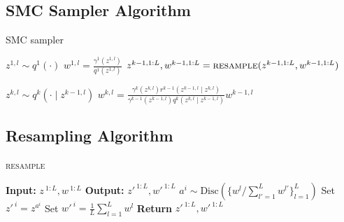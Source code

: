 \documentclass[anonymous=false, %
               format=acmsmall, %
               review=true, %
               screen=true, %
               nonacm=true]{acmart}
\theoremstyle{definition}
\begin{document}
\subsection{SMC Sampler Algorithm}
\label{appendix:smc-alg}
\begin{algorithm}[!h]
  \caption{SMC sampler}
  \label{alg:smcs}
\begin{algorithmic}[1]
    \small
        \State $z^{1,l} \sim q^1(\cdot)$
        \State $w^{1,l} = \frac{\gamma^1(z^{1,l})}{q^1(z^{1,l})}$
    \EndFor
      \State$z^{k-1,1:L}, w^{k-1,1:L}=\textsc{resample}(z^{k-1,1:L}, w^{k-1,1:L})$

          \State $z^{k,l} \sim q^k(\cdot \mid z^{k-1,l})$\label{line:apg-propose}
          \State $w^{k,l} = \frac{\gamma^k(z^{k,l}) r^{k-1}(z^{k-1,l} \mid z^{k,l})}{\gamma^{k-1}(z^{k-1,l}) q^k(z^{k,l} \mid z^{k-1,l})}w^{k-1,l}$
      \EndFor
    \EndFor
\end{algorithmic}
\end{algorithm}

\subsection{Resampling Algorithm}
\label{appendix:resample-alg}
\begin{algorithm}[!h]
  \caption{\textsc{resample}}
  \label{alg:resample}
\begin{algorithmic}[1]
\small
  \State \textbf{Input:} $z^{\:1:L}, w^{\:1:L}$
  \State \textbf{Output:} $z'^{\:1:L}, w'^{\:1:L}$
    \State $a^i \sim \mathrm{Disc}(\{w^l / \sum_{l' = 1}^L w^{l'}\}_{l=1}^L)$ 
    \State Set $ z'^{\:i} = z^{a^i}$
    \State Set $ w'^{\:i} = \frac{1}{L} \sum_{l = 1}^L w^l$
    \EndFor
  \State \textbf{Return} $z'^{\:1:L}, w'^{\:1:L}$
\end{algorithmic}
\end{algorithm}
\end{document}
